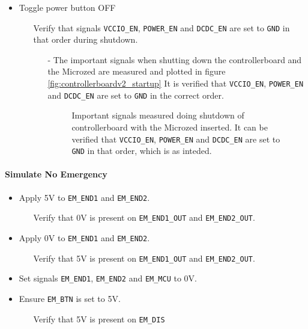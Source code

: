 \begin{itemize}
\begin{itemize}
\begin{itemize}
		\end{itemize}
	\end{itemize}
	\item Toggle power button OFF
	\begin{itemize}
		\item[\cmark] Verify that signals \texttt{VCCIO\_EN}, \texttt{POWER\_EN} and \texttt{DCDC\_EN} are set to \texttt{GND} in that order during shutdown. 
		\begin{itemize}
			\item[-] The important signals when shutting down the controllerboard and the Microzed are measured and plotted in figure \ref{fig:controllerboardv2_startup}
			It is verified that \texttt{VCCIO\_EN}, \texttt{POWER\_EN} and \texttt{DCDC\_EN} are set to \texttt{GND} in the correct order. 
			\begin{figure}[h]
				\centering
			    
				\caption{Important signals measured doing shutdown of controllerboard with the Microzed inserted. It can be verified that \texttt{VCCIO\_EN}, \texttt{POWER\_EN} and \texttt{DCDC\_EN} are set to \texttt{GND} in that order, which is as inteded.}
				\label{fig:controllerboardv2_shutdown}
			\end{figure}

		\end{itemize}
	\end{itemize}
\end{itemize}
\paragraph{Simulate No Emergency} %
\label{par:simulate_no_emergency}
\begin{itemize}
	\item Apply 5V to \texttt{EM\_END1} and \texttt{EM\_END2}.
	\begin{itemize}
		\item[\cmark] Verify that 0V is present on \texttt{EM\_END1\_OUT} and \texttt{EM\_END2\_OUT}.
	\end{itemize}
	\item Apply 0V to \texttt{EM\_END1} and \texttt{EM\_END2}.
	\begin{itemize}
		\item[\cmark] Verify that 5V is present on \texttt{EM\_END1\_OUT} and \texttt{EM\_END2\_OUT}.
	\end{itemize}
	\item Set signals \texttt{EM\_END1}, \texttt{EM\_END2} and \texttt{EM\_MCU} to 0V.
	\item Ensure \texttt{EM\_BTN} is set to 5V.
	\begin{itemize}
		\item[\cmark] Verify that 5V is present on \texttt{EM\_DIS}
	\end{itemize}
\end{itemize}
